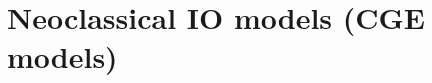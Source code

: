 \documentclass[utf8,aspectratio=169,ngerman,english]{beamer}
\begin{document}



\section{Neoclassical IO models (CGE models)}
\end{document}

